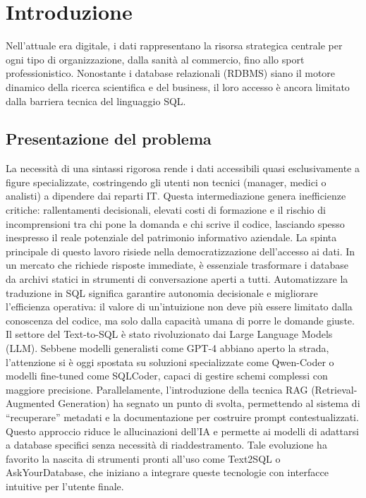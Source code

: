 \chapter{Introduzione} %
\label{cha:introduzione}

Nell'attuale era digitale, i dati rappresentano la risorsa strategica
centrale per ogni tipo di organizzazione, dalla sanità al commercio, fino
allo sport professionistico. Nonostante i database relazionali (RDBMS)
siano il motore dinamico della ricerca scientifica e del business, il
loro accesso è ancora limitato dalla barriera tecnica del linguaggio
SQL.

\section{Presentazione del
problema}\label{presentazione-del-problema}

La necessità di una sintassi rigorosa rende i dati accessibili quasi
esclusivamente a figure specializzate, costringendo gli utenti non
tecnici (manager, medici o analisti) a dipendere dai reparti IT. Questa
intermediazione genera inefficienze critiche: rallentamenti decisionali,
elevati costi di formazione e il rischio di incomprensioni tra chi pone
la domanda e chi scrive il codice, lasciando spesso inespresso il reale
potenziale del patrimonio informativo aziendale. La spinta principale di
questo lavoro risiede nella democratizzazione dell'accesso ai dati. In
un mercato che richiede risposte immediate, è essenziale trasformare i
database da archivi statici in strumenti di conversazione aperti a
tutti. Automatizzare la traduzione in SQL significa garantire autonomia
decisionale e migliorare l'efficienza operativa: il valore di
un'intuizione non deve più essere limitato dalla conoscenza del codice,
ma solo dalla capacità umana di porre le domande giuste. Il settore del
Text-to-SQL è stato rivoluzionato dai Large Language Models (LLM).
Sebbene modelli generalisti come GPT-4 abbiano aperto la strada,
l'attenzione si è oggi spostata su soluzioni specializzate come
Qwen-Coder o modelli fine-tuned come SQLCoder, capaci di gestire schemi
complessi con maggiore precisione. Parallelamente, l'introduzione della
tecnica RAG (Retrieval-Augmented Generation) ha segnato un punto di
svolta, permettendo al sistema di ``recuperare'' metadati e la
documentazione per costruire prompt contestualizzati. Questo approccio
riduce le allucinazioni dell'IA e permette ai modelli di adattarsi a
database specifici senza necessità di riaddestramento. Tale evoluzione
ha favorito la nascita di strumenti pronti all'uso come Text2SQL o
AskYourDatabase, che iniziano a integrare queste tecnologie con
interfacce intuitive per l'utente finale.

